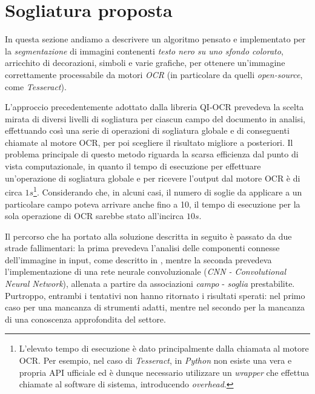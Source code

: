 \section{Sogliatura proposta}
\label{sec:image-bin-proposed-approach}
In questa sezione andiamo a descrivere un algoritmo pensato e implementato per la \textit{segmentazione} di immagini contenenti \textit{testo nero su uno sfondo colorato}, arricchito di decorazioni, simboli e varie grafiche, per ottenere un'immagine correttamente processabile da motori \textit{OCR} (in particolare da quelli \textit{open-source}, come \textit{Tesseract}).\par
L'approccio precedentemente adottato dalla libreria QI-OCR prevedeva la scelta mirata di diversi livelli di sogliatura per ciascun campo del documento in analisi, effettuando cos\`i una serie di operazioni di sogliatura globale e di conseguenti chiamate al motore OCR, per poi scegliere il risultato migliore a posteriori. Il problema principale di questo metodo riguarda la scarsa efficienza dal punto di vista computazionale, in quanto il tempo di esecuzione per effettuare un'operazione di sogliatura globale e per ricevere l'output dal motore OCR \`e di circa $1s$\footnote{L'elevato tempo di esecuzione \`e dato principalmente dalla chiamata al motore OCR. Per esempio, nel caso di \textit{Tesseract}, in \textit{Python} non esiste una vera e propria API ufficiale ed \`e dunque necessario utilizzare un \textit{wrapper} che effettua chiamate al software di sistema, introducendo \textit{overhead}.}. Considerando che, in alcuni casi, il numero di soglie da applicare a un particolare campo poteva arrivare anche fino a 10, il tempo di esecuzione per la sola operazione di OCR sarebbe stato all'incirca $10s$.\par
Il percorso che ha portato alla soluzione descritta in seguito \`e passato da due strade fallimentari:
la prima prevedeva l'analisi delle componenti connesse dell'immagine in input, come descritto in \cite{bib:text-extraction}, mentre la seconda prevedeva l'implementazione di una rete neurale convoluzionale (\textit{CNN - Convolutional Neural Network}), allenata a partire da associazioni \textit{campo} - \textit{soglia} prestabilite. Purtroppo, entrambi i tentativi non hanno ritornato i risultati sperati: nel primo caso per una mancanza di strumenti adatti, mentre nel secondo per la mancanza di una conoscenza approfondita del settore.

